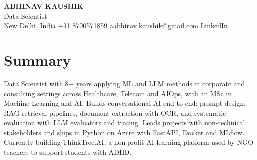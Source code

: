 \documentclass[10pt,a4paper]{article}
\begin{document}
\begin{center}
  {\LARGE\bfseries ABHINAV KAUSHIK}\\[2pt]
  {\large Data Scientist}\\[2pt]
  New Delhi, India \textbar{} +91 8700571859 \textbar{} \href{mailto:aabhinav.kaushik@gmail.com}{aabhinav.kaushik@gmail.com} \textbar{} \href{https://www.linkedin.com/in/abhinav-kaushik10/}{LinkedIn}  
\end{center}

\section{Summary}
Data Scientist with 8+ years applying ML and LLM methods in corporate and consulting settings across Healthcare, Telecom and AIOps, with an MSc in Machine Learning and AI. Builds conversational AI end to end: prompt design, RAG retrieval pipelines, document extraction with OCR, and systematic evaluation with LLM evaluators and tracing. Leads projects with non-technical stakeholders and ships in Python on Azure with FastAPI, Docker and MLflow. Currently building ThinkTree.AI, a non-profit AI learning platform used by NGO teachers to support students with ADHD.
\end{document}
